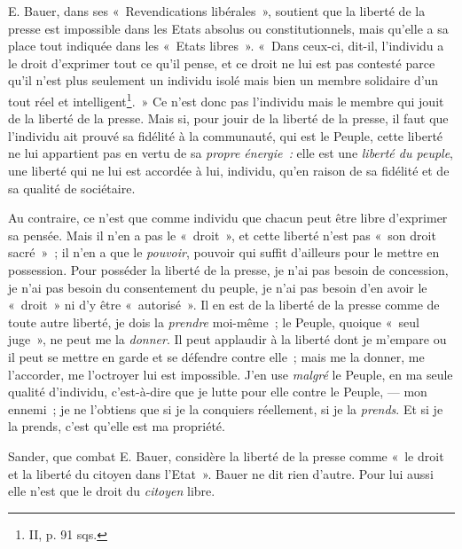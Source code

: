 \documentclass[french,twoside]{book} %
\begin{document}
E. Bauer, dans ses « Revendications libérales », soutient que la liberté de la presse est impossible dans les Etats absolus ou constitutionnels, mais qu’elle a sa place tout indiquée dans les « Etats libres ». « Dans ceux-ci, dit-il, l’individu a le droit d’exprimer tout ce qu’il pense, et ce droit ne lui est pas contesté parce qu’il n’est plus seulement un individu isolé mais bien un membre solidaire d’un tout réel et intelligent\footnote{ \noindent II, p. 91 sqs.
 }. » Ce n’est donc pas l’individu mais le membre qui jouit de la liberté de la presse. Mais si, pour jouir de la liberté de la presse, il faut que l’individu ait prouvé sa fidélité à la communauté, qui est le Peuple, cette liberté ne lui appartient pas en vertu de sa \emph{propre énergie :} elle est une \emph{liberté du peuple}, une liberté qui ne lui est accordée à lui, individu, qu’en raison de sa fidélité et de sa qualité de sociétaire.\par
Au contraire, ce n’est que comme individu que chacun peut être libre d’exprimer sa pensée. Mais il n’en a pas le « droit », et cette liberté n’est pas « son droit sacré » ; il n’en a que le \emph{pouvoir}, pouvoir qui suffit  d’ailleurs pour le mettre en possession. Pour posséder la liberté de la presse, je n’ai pas besoin de concession, je n’ai pas besoin du consentement du peuple, je n’ai pas besoin d’en avoir le « droit » ni d’y être « autorisé ». Il en est de la liberté de la presse comme de toute autre liberté, je dois la \emph{prendre} moi-même ; le Peuple, quoique « seul juge », ne peut me la \emph{donner}. Il peut applaudir à la liberté dont je m’empare ou il peut se mettre en garde et se défendre contre elle ; mais me la donner, me l’accorder, me l’octroyer lui est impossible. J’en use \emph{malgré} le Peuple, en ma seule qualité d’individu, c’est-à-dire que je lutte pour elle contre le Peuple, — mon ennemi ; je ne l’obtiens que si je la conquiers réellement, si je la \emph{prends}. Et si je la prends, c’est qu’elle est ma propriété.\par
Sander, que combat E. Bauer, considère la liberté de la presse comme « le droit et la liberté du citoyen dans l’Etat ». Bauer ne dit rien d’autre. Pour lui aussi elle n’est que le droit du \emph{citoyen} libre.\par
\end{document}
